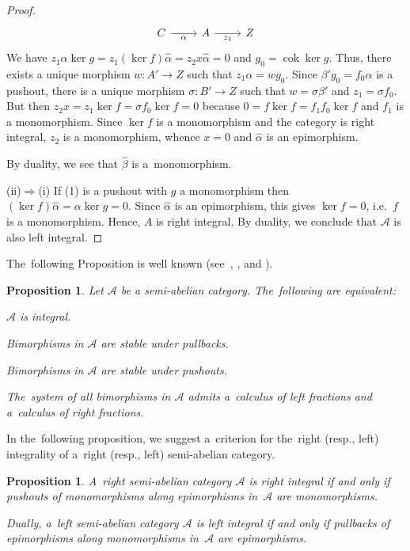 \documentclass[a4paper,10pt,reqno]{amsart}
\newtheorem{prop}[thm]{Proposition}
\newcommand{\coker}{\operatorname{cok}\nolimits}
\begin{document}
\begin{proof}
$$\begin{tikzcd}
			C \arrow[r, "\alpha"']                     & A \arrow[r, "z_1"']                                                                       & Z                 
		\end{tikzcd}
		$$
		We have $z_1\alpha\ker g=z_1(\ker f)\hat\alpha = z_2 x \hat\alpha=0$ and $g_0=\coker\ker g$. Thus, there exists a unique morphism $w\colon A'\rightarrow Z$ such that $z_1\alpha=w g_0$. Since $\beta' g_0=f_0\alpha$ is a pushout, there is a unique morphism $\sigma\colon B'\rightarrow Z$ such that $w=\sigma\beta'$ and $z_1=\sigma f_0$. But then $z_2 x=z_1 \ker f=\sigma f_0 \ker f=0$ because $0=f\ker f=f_1 f_0 \ker f$ and $f_1$ is a monomorphism. Since $\ker f$ is a monomorphism and the category is right integral, $z_2$ is a monomorphism, whence $x=0$ and $\hat\alpha$ is an epimorphism. 
		
		By duality, we see that $\hat\beta$ is a~monomorphism.
		\smallskip
		
		(ii)$\Rightarrow$(i) If (1) is a pushout with $g$ a monomorphism then $(\ker f)\hat\alpha = \alpha\ker g=0$. Since $\hat\alpha$ is an epimorphism, this gives $\ker f=0$, i.e.~$f$ is a monomorphism. Hence, $A$ is right integral. By duality, we conclude that $\mathcal{A}$ is also left integral. 
	\end{proof}
	
	The~following Proposition is well known (see~\cite[Proposition~7]{BanicaPopescu1965}, \cite[Proposition~6]{Rump2001}, and \cite[Proposition~4.1]{BuanMarsh2012}).
	
	\begin{prop}\label{sa-int1}
		Let $\mathcal{A}$ be a semi-abelian category. The~following are equivalent:
		\item[(i)] $\mathcal{A}$ is integral.
		\item[(ii)] Bimorphisms in $\mathcal{A}$ are stable under pullbacks.
		\item[(iii)] Bimorphisms in $\mathcal{A}$ are stable under pushouts.
		\item[(iv)] The~system of all bimorphisms in $\mathcal{A}$ admits
		a~calculus of left fractions and a~calculus of right fractions.
	\end{prop}
	
	In the~following proposition, we suggest a~criterion 
	for the~right (resp., left) integrality of a~right (resp., left) semi-abelian category. 
	
	\begin{prop}\label{sa-int2}
		A~right semi-abelian category $\mathcal{A}$ is right integral if and only if pushouts of monomorphisms along epimorphisms in~$\mathcal{A}$ are monomorphisms.
		
		Dually, a~left semi-abelian category $\mathcal{A}$ is left integral if and only if pullbacks of epimorphisms along monomorphisms in~$\mathcal{A}$ are epimorphisms.
	\end{prop}
	
\end{document}
